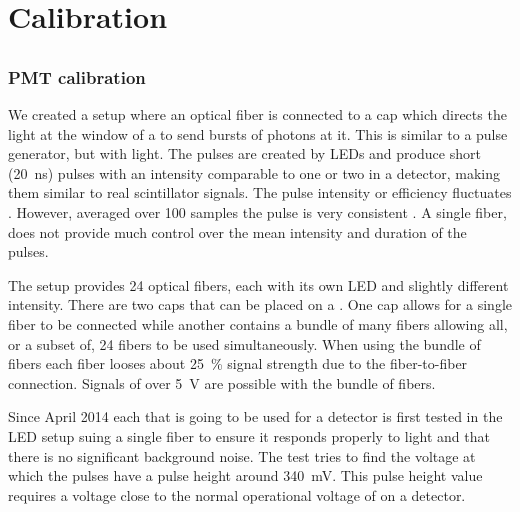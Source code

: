 \chapter{Calibration}
\label{ch:calibration}

\section{\pmt}
\label{sec:pmt}


\subsection{PMT calibration}
\label{sub:pmt_calibration}

We created a setup where an optical fiber is connected to a cap which
directs the light at the window of a \pmt to send bursts of photons at
it. This is similar to a pulse generator, but with light. The pulses are
created by LEDs and produce short (\SI{20}{\nano\second}) pulses with an
intensity comparable to one or two \mip in a detector, making them
similar to real scintillator signals. The pulse intensity or efficiency
fluctuates . However,
averaged over 100 samples the pulse is very consistent
. A single fiber,
does not provide much control over the mean intensity and duration of
the pulses.

The setup provides 24 optical fibers, each with its own LED and slightly
different intensity. There are two caps that can be placed on a \pmt.
One cap allows for a single fiber to be connected while another contains
a bundle of many fibers allowing all, or a subset of, 24 fibers to be
used simultaneously. When using the bundle of fibers each fiber looses about
\SI{25}{\percent} signal strength due to the fiber-to-fiber connection.
Signals of over \SI{5}{\volt} are possible with the bundle of fibers.

Since April 2014 each \pmt that is going to be used for a \hisparc
detector is first tested in the LED setup suing a single fiber to ensure
it responds properly to light and that there is no significant
background noise. The test tries to find the voltage at which the pulses
have a pulse height around \SI{340}{\milli\volt}. This pulse height
value requires a voltage close to the normal operational voltage of
\pmts on a \hisparc detector.


